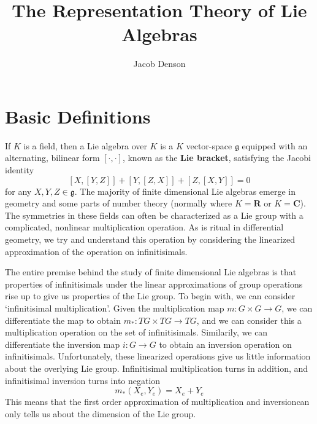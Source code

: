 

\title{The Representation Theory of Lie Algebras}
\author{Jacob Denson}




\maketitle

\tableofcontents


\chapter{Basic Definitions}

If $K$ is a field, then a Lie algebra over $K$ is a $K$ vector-space $\mathfrak{g}$ equipped with an alternating, bilinear form $[\cdot, \cdot]$, known as the {\bf Lie bracket}, satisfying the Jacobi identity
%
\[ [X,[Y,Z]] + [Y,[Z,X]] + [Z,[X,Y]] = 0 \]
%
for any $X,Y,Z \in \mathfrak{g}$. The majority of finite dimensional Lie algebras emerge in geometry and some parts of number theory (normally where $K = \mathbf{R}$ or $K = \mathbf{C}$). The symmetries in these fields can often be characterized as a Lie group with a complicated, nonlinear multiplication operation. As is ritual in differential geometry, we try and understand this operation by considering the linearized approximation of the operation on infinitisimals.

The entire premise behind the study of finite dimensional Lie algebras is that properties of infinitisimals under the linear approximations of group operations rise up to give us properties of the Lie group. To begin with, we can consider `infinitisimal multiplication'. Given the multiplication map $m: G \times G \to G$, we can differentiate the map to obtain $m_*: TG \times TG \to TG$, and we can consider this a multiplication operation on the set of infinitisimals. Similarily, we can differentiate the inversion map $i: G \to G$ to obtain an inversion operation on infinitisimals. Unfortunately, these linearized operations give us little information about the overlying Lie group. Infinitisimal multiplication turns in addition, and infinitisimal inversion turns into negation
%
\[ m_*(X_e, Y_e) = X_e + Y_e \]
%
This means that the first order approximation of multiplication and inversioncan only tells us about the dimension of the Lie group.

